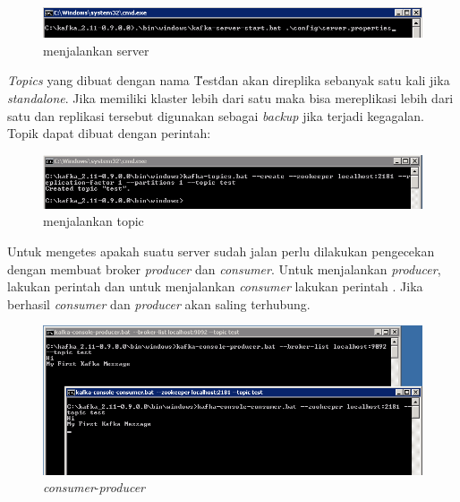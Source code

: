 \documentclass[a4paper,twoside]{article}
\begin{document}
\begin{enumerate}
		\begin{figure}[H] 
		\centering  
		\includegraphics[scale=0.8]{serverkafka}  
		\caption[Gambar menjalankan server]{menjalankan server} 
		\label{fig:topic-run} 
		\end{figure}

		\textit{Topics} yang dibuat dengan nama \"Test\" dan akan direplika sebanyak satu kali jika 			\textit{standalone}. Jika memiliki klaster lebih dari satu maka bisa mereplikasi lebih dari 			satu dan replikasi tersebut digunakan sebagai \textit{backup} jika terjadi kegagalan. Topik 			dapat dibuat dengan perintah: 

		\begin{figure}[H] 
		\centering  
		\includegraphics[scale=0.8]{topickafka}  
		\caption[Gambar menjalankan topic]{menjalankan topic} 
		\label{fig:topic-run} 
		\end{figure}

		Untuk mengetes apakah suatu server sudah jalan perlu dilakukan pengecekan dengan membuat 				broker \textit{producer} dan \textit{consumer}. Untuk menjalankan \textit{producer}, lakukan 		perintah  dan 				untuk menjalankan \textit{consumer} lakukan perintah . Jika berhasil \textit{consumer} dan 							\textit{producer} akan saling terhubung.

		\begin{figure}[H] 
		\centering  
		\includegraphics[scale=0.8]{10}  
		\caption[Gambar \textit{consumer}-\textit{producer}]{\textit{consumer}-\textit{producer}} 
		\label{fig:topic-run} 
		\end{figure}
		

\end{enumerate}
\end{document}

